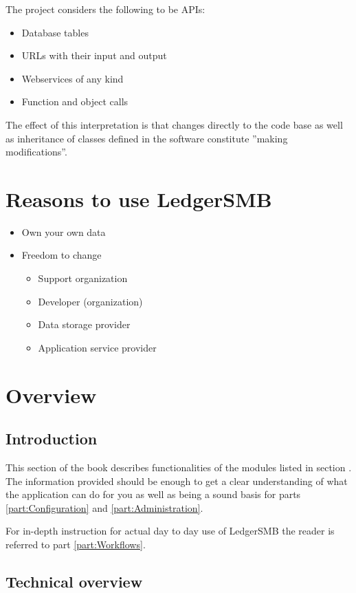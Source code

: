 The project considers the following to be APIs:
\begin{itemize}
\item Database tables
\item URLs with their input and output
\item Webservices of any kind
\item Function and object calls
\end{itemize}

The effect of this interpretation is that changes directly to the code base as
well as inheritance of classes defined in the software constitute ''making modifications''.

\chapter{Reasons to use LedgerSMB}

\begin{itemize}
\item Own your own data
\item Freedom to change
	\begin{itemize}
	\item Support organization
	\item Developer (organization)
	\item Data storage provider
	\item Application service provider
	\end{itemize}
\end{itemize}

\chapter{Overview}

\section{Introduction}
This section of the book describes functionalities of the modules listed in section .  The information provided should be enough to get a clear
understanding of what the application can do for you as well as being a sound basis
for parts \ref{part:Configuration} and \ref{part:Administration}.

For in-depth instruction for actual day to day use of LedgerSMB the reader is referred
to part \ref{part:Workflows}.

\section{Technical overview}


